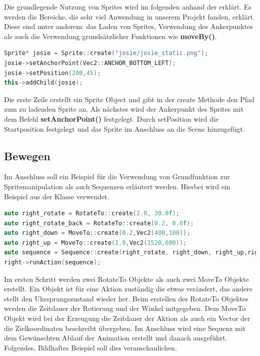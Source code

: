 Die grundlegende Nutzung von Sprites wird im folgenden anhand der  erklärt. Es werden die Bereiche, die sehr viel Anwendung in unserem Projekt fanden, erklärt. Diese sind unter anderem: das Laden von Sprites, Verwendung des Ankerpunktes als auch die Verwendung grundsätzlicher Funktionen wie \textbf{moveBy()}.

\begin{lstlisting}[label=lst:sprite_ancerpoint,
				   language=C++,
				   firstnumber=54,
				   caption=Sprite laden ( TutorialScene.cpp )]
Sprite* josie = Sprite::create("josie/josie_static.png");
josie->setAnchorPoint(Vec2::ANCHOR_BOTTOM_LEFT);
josie->setPosition(200,45);
this->addChild(josie);
\end{lstlisting}

Die erste Zeile erstellt ein Sprite Object und gibt in der create Methode den Pfad zum zu ladenden Sprite an. Als nächstes wird der Ankerpunkt des Sprites mit dem Befehl \textbf{setAnchorPoint()} festgelegt. Durch setPosition wird die Startposition festgelegt und das Sprite im Anschluss an die Scene hinzugefügt. 

\subsection{Bewegen}

Im Anschluss soll ein Beispiel für die Verwendung von Grundfunktion zur Spritemanipulation als auch Sequenzen erläutert werden. Hierbei wird ein Beispiel aus der Klasse  verwendet.

\begin{lstlisting}[label=lst:boss_attack_sequence,
				   language=C++,
				   firstnumber=219,
				   caption=Sequence erstellen ( BossLevel.cpp )]
auto right_rotate = RotateTo::create(2.0, 30.0f);
auto right_rotate_back = RotateTo::create(0.2, 0.0f);
auto right_down = MoveTo::create(0.2,Vec2(400,100));
auto right_up = MoveTo::create(1.0,Vec2(1520,600));
auto sequence = Sequence::create(right_rotate, right_down, right_up,right_rotate_back, nullptr);
right->runAction(sequence);
\end{lstlisting}

Im ersten Schritt werden zwei RotateTo Objekte als auch zwei MoveTo Objekte erstellt. Ein Objekt ist für eine Aktion zuständig die etwas verändert, das andere stellt den Uhrsprungszustand wieder her. Beim erstellen des RotateTo Objektes werden die Zeitdauer der Rotierung und der Winkel mitgegeben. Dem MoveTo Objekt wird bei der Erzeugung die Zeitdauer der Aktion als auch ein Vector der die Zielkoordinaten beschreibt übergeben. Im Anschluss wird eine Sequenz mit dem Gewünschten Ablauf der Animation erstellt und danach ausgeführt. Folgendes, Bildhaftes Beispiel soll dies veranschaulichen. 

